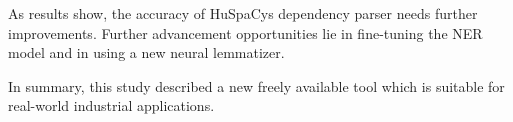 \documentclass{llncs}
\newcommand{\huspacy}{HuSpaCy}
\begin{document}
As results show, the accuracy of \huspacy\textquotesingle s dependency parser needs further improvements. 
Further advancement opportunities lie in fine-tuning the NER model and in using a new neural lemmatizer. 

In summary, this study described a new freely available tool which is suitable for real-world industrial applications.

\end{document}
